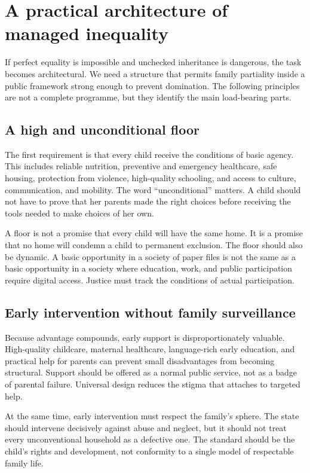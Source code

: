 ﻿\documentclass[12pt,a4paper]{book}
\begin{document}
\section{A practical architecture of managed inequality}

If perfect equality is impossible and unchecked inheritance is dangerous,
the task becomes architectural.  We need a structure that permits family
partiality inside a public framework strong enough to prevent domination.
The following principles are not a complete programme, but they identify
the main load-bearing parts.

\subsection{A high and unconditional floor}

The first requirement is that every child receive the conditions of basic
agency.  This includes reliable nutrition, preventive and emergency
healthcare, safe housing, protection from violence, high-quality schooling,
and access to culture, communication, and mobility.  The word
``unconditional'' matters.  A child should not have to prove that her
parents made the right choices before receiving the tools needed to make
choices of her own.

A floor is not a promise that every child will have the same home.  It is a
promise that no home will condemn a child to permanent exclusion.  The floor
should also be dynamic.  A basic opportunity in a society of paper files is
not the same as a basic opportunity in a society where education, work, and
public participation require digital access.  Justice must track the
conditions of actual participation.

\subsection{Early intervention without family surveillance}

Because advantage compounds, early support is disproportionately valuable.
High-quality childcare, maternal healthcare, language-rich early education,
and practical help for parents can prevent small disadvantages from
becoming structural.  Support should be offered as a normal public service,
not as a badge of parental failure.  Universal design reduces the stigma
that attaches to targeted help.

At the same time, early intervention must respect the family's sphere.  The
state should intervene decisively against abuse and neglect, but it should
not treat every unconventional household as a defective one.  The standard
should be the child's rights and development, not conformity to a single
model of respectable family life.
\end{document}
